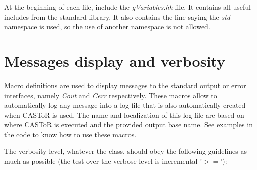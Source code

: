 \documentclass[a4paper, 11pt]{article}
\begin{document}
At the beginning of each file, include the \textit{gVariables.hh} file.
It contains all useful includes from the standard library. It also contains the line saying the \textit{std} namespace is used, so the use of another namespace
is not allowed.

\section{Messages display and verbosity}

Macro definitions are used to display messages to the standard output or error interfaces, namely \textit{Cout} and \textit{Cerr} respectively. These macros
allow to automatically log any message into a log file that is also automatically created when CASToR is used. The name and localization of this log file are
based on where CASToR is executed and the provided output base name. See examples in the code to know how to use these macros.

The verbosity level, whatever the class, should obey the following guidelines as much as possible (the test over the verbose level is incremental '$>=$'):
\end{document}
